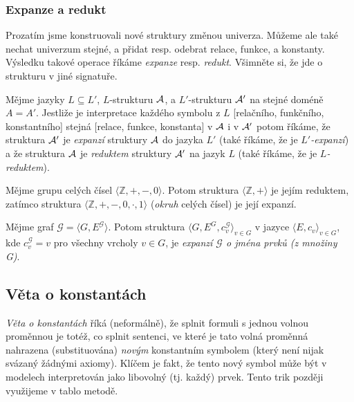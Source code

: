 \subsubsection{Expanze a redukt}

Prozatím jsme konstruovali nové struktury změnou univerza. Můžeme ale také nechat univerzum stejné, a přidat resp. odebrat relace, funkce, a konstanty. Výsledku takové operace říkáme \emph{expanze} resp. \emph{redukt}. Všimněte si, že jde o strukturu v jiné signatuře.

\begin{definition}
    Mějme jazyky $L\subseteq L'$, $L$-strukturu $\mathcal{A}$, a $L'$-strukturu $\mathcal{A}'$ na stejné doméně $A=A'$. Jestliže je interpretace každého symbolu z $L$ [relačního, funkčního, konstantního] stejná [relace, funkce, konstanta] v $\mathcal{A}$ i v $\mathcal{A}'$ potom říkáme, že struktura $\mathcal{A}'$ je \emph{expanzí} struktury $\mathcal{A}$ do jazyka $L'$ (také říkáme, že je \emph{$L'$-expanzí}) a že struktura $\mathcal{A}$ je \emph{reduktem} struktury $\mathcal{A}'$ na jazyk $L$ (také říkáme, že je \emph{$L$-reduktem}).    
\end{definition}

\begin{example}
    Mějme grupu celých čísel $\langle\mathbb Z,+,-,0\rangle$. Potom struktura $\langle \mathbb Z,+\rangle$ je jejím reduktem, zatímco struktura $\langle\mathbb Z,+,-,0,\cdot,1\rangle$ (\emph{okruh} celých čísel) je její expanzí.
\end{example}

\begin{example}
    Mějme graf $\mathcal G=\langle G, E^\mathcal G\rangle$. Potom struktura $\langle G, E^G,c_v^\mathcal G\rangle_{v\in G}$ v jazyce $\langle E,c_v\rangle_{v\in G}$, kde $c_v^\mathcal G=v$ pro všechny vrcholy $v\in G$, je \emph{expanzí $\mathcal G$ o jména prvků (z množiny G)}.
\end{example}


\subsection{Věta o konstantách}

\emph{Věta o konstantách} říká (neformálně), že splnit formuli s jednou volnou proměnnou je totéž, co splnit sentenci, ve které je tato volná proměnná nahrazena (substituována) \emph{novým} konstantním symbolem (který není nijak svázaný žádnými axiomy). Klíčem je fakt, že tento nový symbol může být v modelech interpretován jako libovolný (tj. každý) prvek. Tento trik později využijeme v tablo metodě.

